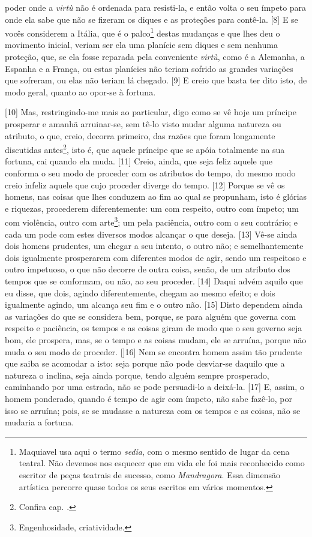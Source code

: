 poder onde a \emph{virtù} não é ordenada para resisti-la, e então volta
o seu ímpeto para onde ela sabe que não se fizeram os diques e as
proteções para contê-la. {[}8{]} E se vocês considerem a Itália, que é o
palco\footnote{Maquiavel usa aqui o termo \emph{sedia}, com o mesmo
  sentido de lugar da cena teatral. Não devemos nos esquecer que em vida
  ele foi mais reconhecido como escritor de peças teatrais de sucesso,
  como \emph{Mandragora}. Essa dimensão artística percorre quase todos
  os seus escritos em vários momentos.} destas mudanças e que lhes deu o
movimento inicial, veriam ser ela uma planície sem diques e sem nenhuma
proteção, que, se ela fosse reparada pela conveniente \emph{virtù}, como
é a Alemanha, a Espanha e a França, ou estas planícies não teriam
sofrido as grandes variações que sofreram, ou elas não teriam lá
chegado. {[}9{]} E creio que basta ter dito isto, de modo geral, quanto
ao opor-se à fortuna.

{[}10{]} Mas, restringindo-me mais ao particular, digo como se vê hoje
um príncipe prosperar e amanhã arruinar-se, sem tê-lo visto mudar alguma
natureza ou atributo, o que, creio, decorra primeiro, das razões que
foram longamente discutidas antes\footnote{Confira cap. .}, isto é,
que aquele príncipe que se apóia totalmente na sua fortuna, cai quando
ela muda. {[}11{]} Creio, ainda, que seja feliz aquele que conforma o
seu modo de proceder com os atributos do tempo, do mesmo modo creio
infeliz aquele que cujo proceder diverge do tempo. {[}12{]} Porque se vê
os homens, nas coisas que lhes conduzem ao fim ao qual se propunham,
isto é glórias e riquezas, procederem diferentemente: um com respeito,
outro com ímpeto; um com violência, outro com arte\footnote{Engenhosidade,
  criatividade.}; um pela paciência, outro com o seu contrário; e cada
um pode com estes diversos modos alcançar o que deseja. {[}13{]} Vê-se
ainda dois homens prudentes, um chegar a seu intento, o outro não; e
semelhantemente dois igualmente prosperarem com diferentes modos de
agir, sendo um respeitoso e outro impetuoso, o que não decorre de outra
coisa, senão, de um atributo dos tempos que se conformam, ou não, ao seu
proceder. {[}14{]} Daqui advém aquilo que eu disse, que dois, agindo
diferentemente, chegam ao mesmo efeito; e dois igualmente agindo, um
alcança seu fim e o outro não. {[}15{]} Disto dependem ainda as
variações do que se considera bem, porque, se para alguém que governa
com respeito e paciência, os tempos e as coisas giram de modo que o seu
governo seja bom, ele prospera, mas, se o tempo e as coisas mudam, ele
se arruína, porque não muda o seu modo de proceder. {[]}16{]} Nem se encontra homem assim tão prudente que saiba se acomodar a isto: seja porque não pode desviar-se daquilo que a natureza o inclina, seja ainda porque, tendo alguém sempre prosperado, caminhando por uma estrada, não se pode persuadi-lo a deixá-la. {[}17{]} E, assim, o homem ponderado, quando é tempo de agir com ímpeto, não sabe fazê-lo, por isso se arruína; pois, se se mudasse a natureza com os tempos e as coisas, não se mudaria a fortuna.

